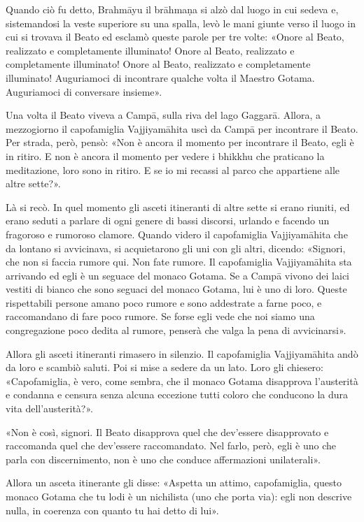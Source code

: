 Quando ciò fu detto, Brahmāyu il brāhmaṇa si alzò dal luogo in cui sedeva e,
sistemandosi la veste superiore su una spalla, levò le mani giunte verso il
luogo in cui si trovava il Beato ed esclamò queste parole per tre volte: «Onore
al Beato, realizzato e completamente illuminato! Onore al Beato, realizzato e
completamente illuminato! Onore al Beato, realizzato e completamente illuminato!
Auguriamoci di incontrare qualche volta il Maestro Gotama. Auguriamoci di
conversare insieme».


Una volta il Beato viveva a Campā, sulla riva del lago Gaggarā. Allora, a
mezzogiorno il capofamiglia Vajjiyamāhita uscì da Campā per incontrare il Beato.
Per strada, però, pensò: «Non è ancora il momento per incontrare il Beato, egli
è in ritiro. E non è ancora il momento per vedere i bhikkhu che praticano la
meditazione, loro sono in ritiro. E se io mi recassi al parco che appartiene
alle altre sette?».

Là si recò. In quel momento gli asceti itineranti di altre sette si erano
riuniti, ed erano seduti a parlare di ogni genere di bassi discorsi, urlando e
facendo un fragoroso e rumoroso clamore. Quando videro il capofamiglia
Vajjiyamāhita che da lontano si avvicinava, si acquietarono gli uni con gli
altri, dicendo: «Signori, che non si faccia rumore qui. Non fate rumore. Il
capofamiglia Vajjiyamāhita sta arrivando ed egli è un seguace del monaco Gotama.
Se a Campā vivono dei laici vestiti di bianco che sono seguaci del monaco
Gotama, lui è uno di loro. Queste rispettabili persone amano poco rumore e sono
addestrate a farne poco, e raccomandano di fare poco rumore. Se forse egli vede
che noi siamo una congregazione poco dedita al rumore, penserà che valga la pena
di avvicinarsi».

Allora gli asceti itineranti rimasero in silenzio. Il capofamiglia Vajjiyamāhita
andò da loro e scambiò saluti. Poi si mise a sedere da un lato. Loro gli
chiesero: «Capofamiglia, è vero, come sembra, che il monaco Gotama disapprova
l’austerità e condanna e censura senza alcuna eccezione tutti coloro che
conducono la dura vita dell’austerità?».

«Non è così, signori. Il Beato disapprova quel che dev’essere disapprovato e
raccomanda quel che dev’essere raccomandato. Nel farlo, però, egli è uno che
parla con discernimento, non è uno che conduce affermazioni unilaterali».

Allora un asceta itinerante gli disse: «Aspetta un attimo, capofamiglia, questo
monaco Gotama che tu lodi è un nichilista (uno che porta via): egli non descrive
nulla, in coerenza con quanto tu hai detto di lui».

